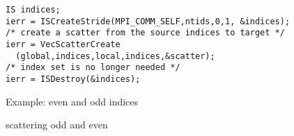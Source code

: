 \begin{numberedframe}
\small
\begin{verbatim}
IS indices;
ierr = ISCreateStride(MPI_COMM_SELF,ntids,0,1, &indices); 
/* create a scatter from the source indices to target */
ierr = VecScatterCreate
  (global,indices,local,indices,&scatter); 
/* index set is no longer needed */
ierr = ISDestroy(&indices); 
\end{verbatim}
\end{numberedframe}

\begin{numberedframe}{Example: even and odd indices}
\small
{}
\end{numberedframe}

\begin{numberedframe}{scattering odd and even}
\small
{}
\end{numberedframe}

